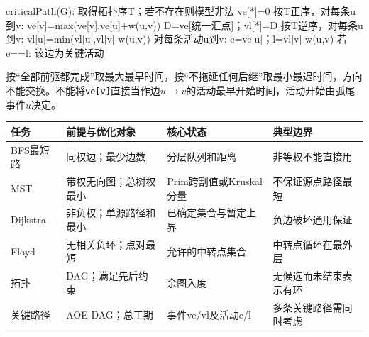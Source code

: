 \par\medskip\noindent\begin{minipage}{\linewidth}
\begin{codeblock}[language={}]
criticalPath(G):
    取得拓扑序T；若不存在则模型非法
    ve[*]=0
    按T正序，对每条u到v: ve[v]=max(ve[v],ve[u]+w(u,v))
    D=ve[统一汇点]；vl[*]=D
    按T逆序，对每条u到v: vl[u]=min(vl[u],vl[v]-w(u,v))
    对每条活动u到v:
        e=ve[u]；l=vl[v]-w(u,v)
        若e==l: 该边为关键活动
\end{codeblock}
\end{minipage}\par\medskip

按``全部前驱都完成''取最大最早时间，按``不拖延任何后继''取最小最迟时间，方向不能交换。不能将\texttt{ve[\allowbreak{}v]\allowbreak{}}直接当作边\(u\to v\)的活动最早开始时间，活动开始由弧尾事件\(u\)决定。

\begin{wideblock}

\par\medskip\noindent\begin{minipage}{\linewidth}\fontsize{9.3}{12}\selectfont\begin{tabularx}{\linewidth}{@{}YYYY@{}}
\toprule\noalign{}
\begin{minipage}[b]{\linewidth}\raggedright
任务
\end{minipage} & \begin{minipage}[b]{\linewidth}\raggedright
前提与优化对象
\end{minipage} & \begin{minipage}[b]{\linewidth}\raggedright
核心状态
\end{minipage} & \begin{minipage}[b]{\linewidth}\raggedright
典型边界
\end{minipage} \\
\midrule\noalign{}


BFS最短路 & 同权边；最少边数 & 分层队列和距离 & 非等权不能直接用 \\
MST & 带权无向图；总树权最小 & Prim跨割值或Kruskal分量 & 不保证源点路径最短 \\
Dijkstra & 非负权；单源路径和最小 & 已确定集合与暂定上界 & 负边破坏通用保证 \\
Floyd & 无相关负环；点对最短 & 允许的中转点集合 & 中转点循环在最外层 \\
拓扑 & DAG；满足先后约束 & 余图入度 & 无候选而未结束表示有环 \\
关键路径 & AOE DAG；总工期 & 事件ve/vl及活动e/l & 多条关键路径需同时考虑 \\
\bottomrule\end{tabularx}
\end{minipage}\par\medskip

\end{wideblock}

